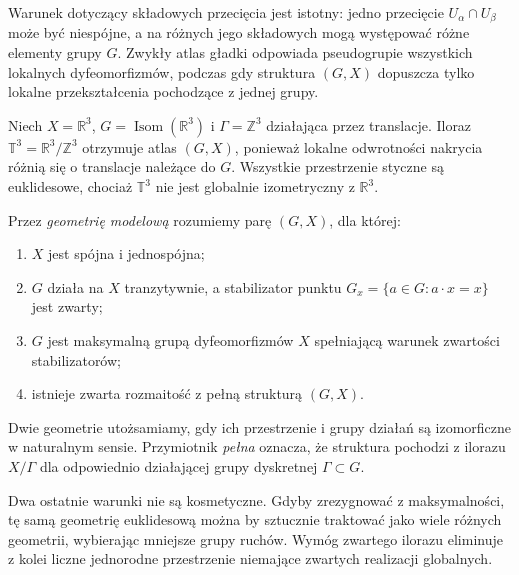 Warunek dotyczący składowych przecięcia jest istotny: jedno przecięcie
$U_\alpha\cap U_\beta$ może być niespójne, a na różnych jego składowych
mogą występować różne elementy grupy $G$. Zwykły atlas gładki odpowiada
pseudogrupie wszystkich lokalnych dyfeomorfizmów, podczas gdy struktura
$(G,X)$ dopuszcza tylko lokalne przekształcenia pochodzące z jednej grupy.

\begin{przyklad}
Niech $X=\mathbb R^3$, $G=\operatorname{Isom}(\mathbb R^3)$ i
$\Gamma=\mathbb Z^3$ działająca przez translacje. Iloraz
$\mathbb T^3=\mathbb R^3/\mathbb Z^3$ otrzymuje atlas $(G,X)$, ponieważ
lokalne odwrotności nakrycia różnią się o translacje należące do $G$.
Wszystkie przestrzenie styczne są euklidesowe, chociaż $\mathbb T^3$
nie jest globalnie izometryczny z $\mathbb R^3$.
\end{przyklad}

\begin{definicja}
\label{def:model-thurston}
Przez \emph{geometrię modelową} rozumiemy parę $(G,X)$, dla której:
\begin{enumerate}
\item $X$ jest spójna i jednospójna;
\item $G$ działa na $X$ tranzytywnie, a stabilizator punktu
      $G_x=\{a\in G:a\cdot x=x\}$ jest zwarty;
\item $G$ jest maksymalną grupą dyfeomorfizmów $X$ spełniającą warunek
      zwartości stabilizatorów;
\item istnieje zwarta rozmaitość z pełną strukturą $(G,X)$.
\end{enumerate}
Dwie geometrie utożsamiamy, gdy ich przestrzenie i grupy działań są
izomorficzne w naturalnym sensie. Przymiotnik \emph{pełna} oznacza, że
struktura pochodzi z ilorazu $X/\Gamma$ dla odpowiednio działającej
grupy dyskretnej $\Gamma\subset G$.
\end{definicja}

Dwa ostatnie warunki nie są kosmetyczne. Gdyby zrezygnować z maksymalności,
tę samą geometrię euklidesową można by sztucznie traktować jako wiele
różnych geometrii, wybierając mniejsze grupy ruchów. Wymóg zwartego
ilorazu eliminuje z kolei liczne jednorodne przestrzenie niemające
zwartych realizacji globalnych.

